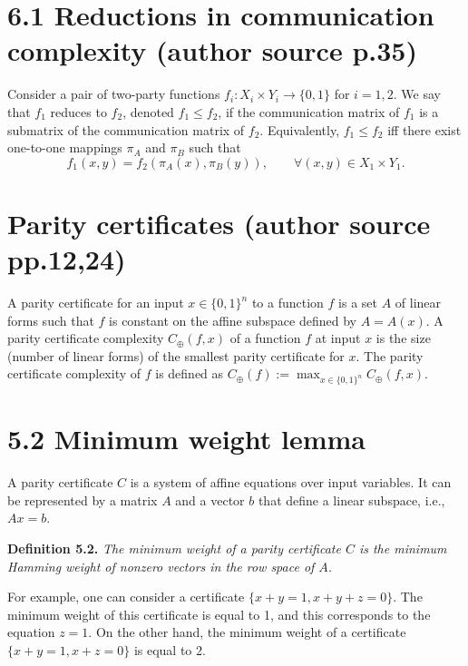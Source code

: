 \documentclass[10pt,a4paper]{article}
\newcommand{\bits}{\{0,1\}}
\newenvironment{originalresult}[1]{\par\medskip\noindent\textbf{#1.}\itshape}{\par\medskip}
\begin{document}
\section*{6.1 Reductions in communication complexity (author source p.35)}
Consider a pair of two-party functions $f_i:X_i\times Y_i\to\bits$ for $i=1,2$. We say that $f_1$ reduces to $f_2$, denoted $f_1\le f_2$, if the communication matrix of $f_1$ is a submatrix of the communication matrix of $f_2$. Equivalently, $f_1\le f_2$ iff there exist one-to-one mappings $\pi_A$ and $\pi_B$ such that
\[f_1(x,y)=f_2(\pi_A(x),\pi_B(y)),\qquad\forall(x,y)\in X_1\times Y_1.\]

\section*{Parity certificates (author source pp.12,24)}
A parity certificate for an input $x\in\bits^n$ to a function $f$ is a set $A$ of linear forms such that $f$ is constant on the affine subspace defined by $A=A(x)$. A parity certificate complexity $C_\oplus(f,x)$ of a function $f$ at input $x$ is the size (number of linear forms) of the smallest parity certificate for $x$. The parity certificate complexity of $f$ is defined as $C_\oplus(f):=\max_{x\in\bits^n}C_\oplus(f,x)$.
\section*{5.2 Minimum weight lemma}
A parity certificate $C$ is a system of affine equations over input variables. It can be represented by a matrix $A$ and a vector $b$ that define a linear subspace, i.e., $Ax=b$.
\begin{originalresult}{Definition 5.2}
The minimum weight of a parity certificate $C$ is the minimum Hamming weight of nonzero vectors in the row space of $A$.
\end{originalresult}
For example, one can consider a certificate $\{x+y=1,x+y+z=0\}$. The minimum weight of this certificate is equal to 1, and this corresponds to the equation $z=1$. On the other hand, the minimum weight of a certificate $\{x+y=1,x+z=0\}$ is equal to 2.
\end{document}
